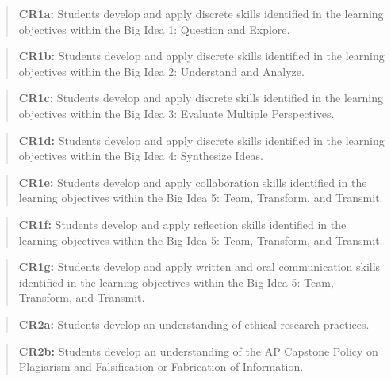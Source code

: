 \documentclass[11pt,]{article}
\begin{document}
\begin{quote}
\textbf{CR1a:} Students develop and apply discrete skills identified in the learning objectives within the Big Idea 1: Question and Explore.
\end{quote}

\begin{quote}
\textbf{CR1b:} Students develop and apply discrete skills identified in the learning objectives within the Big Idea 2: Understand and Analyze.
\end{quote}

\begin{quote}
\textbf{CR1c:} Students develop and apply discrete skills identified in the learning objectives within the Big Idea 3: Evaluate Multiple Perspectives.
\end{quote}

\begin{quote}
\textbf{CR1d:} Students develop and apply discrete skills identified in the learning objectives within the Big Idea 4: Synthesize Ideas.
\end{quote}

\begin{quote}
\textbf{CR1e:} Students develop and apply collaboration skills identified in the learning objectives within the Big Idea 5: Team, Transform, and Transmit.
\end{quote}

\begin{quote}
\textbf{CR1f:} Students develop and apply reflection skills identified in the learning objectives within the Big Idea 5: Team, Transform, and Transmit.
\end{quote}

\begin{quote}
\textbf{CR1g:} Students develop and apply written and oral communication skills identified in the learning objectives within the Big Idea 5: Team, Transform, and Transmit.
\end{quote}

\begin{quote}
\textbf{CR2a:} Students develop an understanding of ethical research practices.
\end{quote}

\begin{quote}
\textbf{CR2b:} Students develop an understanding of the AP Capstone Policy on Plagiarism and Falsification or Fabrication of Information.
\end{quote}
\end{document}
